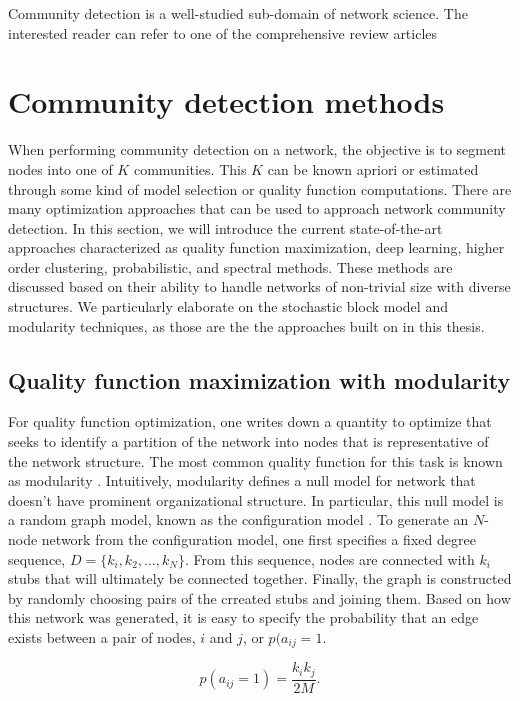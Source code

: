 Community detection is a well-studied sub-domain of network science. The interested reader can refer to one of the comprehensive review articles \cite{fortu1,fortu2,shaicase}

\section{Community detection methods}
When performing community detection on a network, the objective is to segment nodes into one of $K$ communities. This $K$ can be known apriori or estimated through some kind of model selection or quality function computations. There are many optimization approaches that can be used to approach network community detection. In this section, we will introduce the current state-of-the-art approaches characterized as quality function maximization, deep learning, higher order clustering, probabilistic, and spectral methods. These methods are discussed based on their ability to handle networks of non-trivial size with diverse structures. We particularly elaborate on the stochastic block model and modularity techniques, as those are the the approaches built on in this thesis. 

\subsection{Quality function maximization with modularity}
\indent For quality function optimization, one writes down a quantity to optimize that seeks to identify a partition of the network into nodes that is representative of the network structure. The most common quality function for this task is known as modularity \cite{newman2006modularity}. Intuitively, modularity defines a null model for network that doesn't have prominent organizational structure. In particular, this null model is a random graph model, known as the configuration model \cite{benderCanfield}. To generate an $N$-node network from the configuration model, one first specifies a fixed degree sequence, $D=\{k_{i},k_{2},\dots,k_{N}\}$. From this sequence, nodes are connected with $k_{i}$ stubs that will ultimately be connected together. Finally, the graph is constructed by randomly choosing pairs of the crreated stubs and joining them. Based on how this network was generated, it is easy to specify the probability that an edge exists between a pair of nodes, $i$ and $j$, or $p(a_{ij}=1$.

\begin{equation}
p(a_{ij}=1)=\frac{k_{i}k_{j}}{2M}.
\end{equation}

